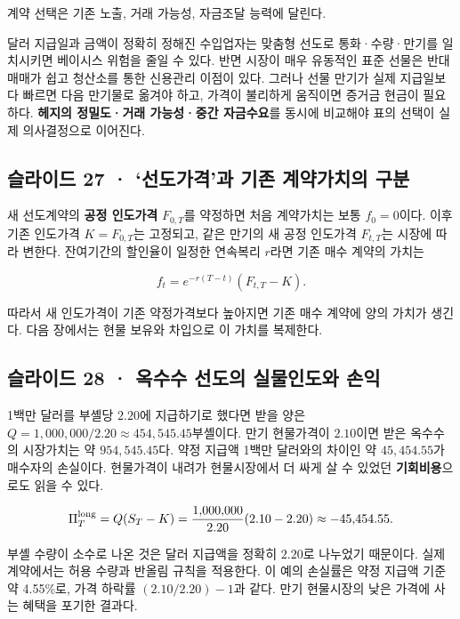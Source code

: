\documentclass[11pt,a4paper]{article}
\begin{document}
계약 선택은 기존 노출, 거래 가능성, 자금조달 능력에 달린다.\par

달러 지급일과 금액이 정확히 정해진 수입업자는 맞춤형 선도로 통화·수량·만기를 일치시키면 베이시스 위험을 줄일 수 있다. 반면 시장이 매우 유동적인 표준 선물은 반대매매가 쉽고 청산소를 통한 신용관리 이점이 있다. 그러나 선물 만기가 실제 지급일보다 빠르면 다음 만기물로 옮겨야 하고, 가격이 불리하게 움직이면 증거금 현금이 필요하다. \textbf{헤지의 정밀도·거래 가능성·중간 자금수요}를 동시에 비교해야 표의 선택이 실제 의사결정으로 이어진다.\par

\subsection{슬라이드 27 · ‘선도가격’과 기존 계약가치의 구분}
새 선도계약의 \textbf{공정 인도가격} $F_{0,T}$를 약정하면 처음 계약가치는 보통 $f_0=0$이다. 이후 기존 인도가격 $K=F_{0,T}$는 고정되고, 같은 만기의 새 공정 인도가격 $F_{t,T}$는 시장에 따라 변한다. 잔여기간의 할인율이 일정한 연속복리 $r$라면 기존 매수 계약의 가치는\par

\[
f_t=e^{-r(T-t)}(F_{t,T}-K).
\]

따라서 새 인도가격이 기존 약정가격보다 높아지면 기존 매수 계약에 양의 가치가 생긴다. 다음 장에서는 현물 보유와 차입으로 이 가치를 복제한다.\par

\subsection{슬라이드 28 · 옥수수 선도의 실물인도와 손익}
1백만 달러를 부셸당 $2.20$에 지급하기로 했다면 받을 양은 $Q=1,000,000/2.20\approx454,545.45$부셸이다. 만기 현물가격이 $2.10$이면 받은 옥수수의 시장가치는 약 $954,545.45$다. 약정 지급액 1백만 달러와의 차이인 약 $45,454.55$가 매수자의 손실이다. 현물가격이 내려가 현물시장에서 더 싸게 살 수 있었던 \textbf{기회비용}으로도 읽을 수 있다.\par

\[
\Pi_T^{\rm long}=Q(S_T-K)=\frac{1{,}000{,}000}{2.20}(2.10-2.20)\approx-45{,}454.55.
\]

부셸 수량이 소수로 나온 것은 달러 지급액을 정확히 $2.20$로 나누었기 때문이다. 실제 계약에서는 허용 수량과 반올림 규칙을 적용한다. 이 예의 손실률은 약정 지급액 기준 약 4.55\%로, 가격 하락률 $(2.10/2.20)-1$과 같다. 만기 현물시장의 낮은 가격에 사는 혜택을 포기한 결과다.\par
\end{document}

